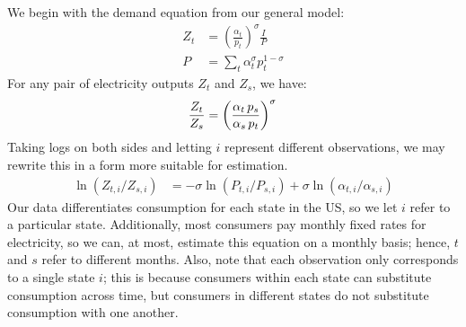 \documentclass[11pt,a4paper,leqno]{extarticle}
\begin{document}
	
	We begin with the demand equation from our general model:
	\begin{align*}
	Z_t &= \left(\frac{\alpha_t}{p_t} \right)^\sigma \frac{I}{P} \\
	P &= \sum_t \alpha_t^\sigma p_t^{1-\sigma}
	\end{align*}
	For any pair of electricity outputs $Z_t$ and $Z_s$, we have:
	$$\frac{Z_t}{Z_s} = \left(\frac{\alpha_t \, p_s}{\alpha_s \, p_t} \right)^\sigma \\$$
	Taking logs on both sides and letting $i$ represent different observations, we may rewrite this in a form more suitable for estimation. 
	\begin{align*}
	\ln (Z_{t, i} / Z_{ s, i}) &= -\sigma \ln (P_{t,i} / P_{s,i}) + \sigma \ln (\alpha_{t,i} / \alpha_{s,i}) 
	\end{align*}
	Our data differentiates consumption for each state in the US, so we let $i$ refer to a particular state. Additionally, most consumers pay monthly fixed rates for electricity, so we can, at most, estimate this equation on a monthly basis; hence, $t$ and $s$ refer to different months. Also, note that each observation only corresponds to a single state $i$; this is because consumers within each state can substitute consumption across time, but consumers in different states do not substitute consumption with one another. 
	
\end{document}
